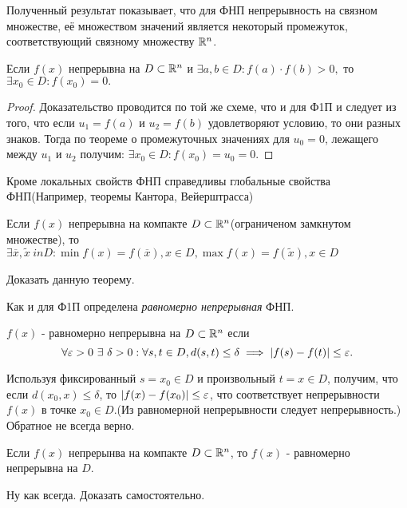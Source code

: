 \documentclass[../../main.tex]{subfiles}
\begin{document}
		Полученный результат показывает, что для ФНП непрерывность на связном
		множестве, её множеством значений является некоторый промежуток,
		соответствующий связному множеству $\mathbb{R}^n$.\\
    \begin{crl*}
			Если $f(x)$ непрерывна на $D \subset \mathbb{R}^n$ и $\exists a,b \in D: 
			f(a) \cdot f(b) > 0,$ то $\exists x_0 \in D : f(x_0) = 0.$
	\end{crl*}
    \begin{proof}
    	Доказательство проводится по той же схеме, что и для Ф1П и следует из 
    	того, что если $u_1 = f(a)$ и $u_2 = f(b)$ удовлетворяют условию, то 
    	они разных знаков. Тогда по теореме о промежуточных значениях для 
    	$u_0 = 0$, лежащего между $u_1$ и $u_2$ получим:
    	$\exists x_0 \in D: f(x_0) = u_0 = 0.$ 
    \end{proof}
	Кроме локальных свойств ФНП справедливы глобальные свойства ФНП(Например,
	теоремы Кантора, Вейерштрасса)
	\begin{thm}
		Если $f(x)$ непрерывна на компакте $D \subset \mathbb{R}^n$(ограниченом 
		замкнутом множестве), то $\exists \overline{x}, \widetilde{x}\ in D :
		\min f(x) = f(\overline{x}), x \in D, \max f(x) = f(\widetilde{x}), x 
		\in D$
	\end{thm}
	\begin{exc}
		Доказать данную теорему.
	\end{exc}
	Как и для Ф1П определена \emph{равномерно непрерывная} ФНП.
	\begin{defn}
		$f(x)$ - равномерно непрерывна на $D \subset \mathbb{R}^n$ если 
		\[
			\forall \eps > 0 \ \exists \ \delta > 0 : \forall s, t \in D,
			d(s, t) \leq \delta \implies |f(s) - f(t)| \leq \eps.
		\]
	\end{defn}
	Используя фиксированный $s = x_0 \in D$ и произвольный $t = x \in D$, 
	получим, что если $d(x_0, x) \leq \delta$, то $|f(x) - f(x_0)| \leq \varepsilon$,
	что соответствует непрерывности $f(x)$ в точке $x_0 \in D$.(Из равномерной 
	непрерывности следует непрерывность.) Обратное не всегда верно.
	\begin{thm}
		Если $f(x)$ непрерынва на компакте $D \subset \mathbb{R}^n$, то $f(x)$ - 
		равномерно непрерывна на $D$.
	\end{thm} 
	\begin{exc}
		Ну как всегда. Доказать самостоятельно.
	\end{exc}
\end{document}
